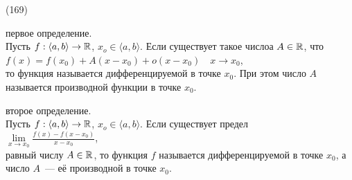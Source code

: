 (169)

\q первое определение.\\
Пусть $f: \langle a, b\rangle \to \mathbb{R}$, $x_o \in \langle a, b\rangle$. Если существует такое числоа $A \in \mathbb{R}$, что\\
$f(x) = f(x_0) + A(x - x_0) + o(x - x_0) \quad x \to x_0$,\\
то функция называется дифференцируемой в точке $x_0$. При этом число $A$ называется производной функции в точке $x_0$.

\q второе определение.\\
Пусть $f: \langle a, b\rangle \to \mathbb{R}$, $x_o \in \langle a, b\rangle$.
Если существует предел\\
$\lim\limits_{x\to x_0} \frac{f(x) - f(x - x_0)}{x - x_0}$,\\
равный числу $A \in \mathbb{R}$, то функция $f$ называется дифференцируемой в точке $x_0$, а число $A$~--- её производной в точке $x_0$.